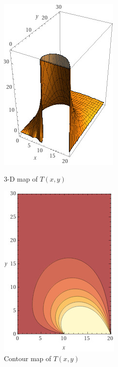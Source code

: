 \documentclass{article}
\numberwithin{equation}{section}
\begin{document}
\begin{figure}[!htb]
   \begin{minipage}{0.48\textwidth}
     \centering
     \includegraphics[width=.7\linewidth]{plot2.1.jpg}
     \caption{3-D map of $T(x,y)$}\label{Fig: 2.1}
   \end{minipage}\hfill
   \begin{minipage}{0.48\textwidth}
     \centering
     \includegraphics[width=.7\linewidth]{plot2.2.jpg}
     \caption{Contour map of $T(x,y)$}\label{Fig: 2.2}
   \end{minipage}
\end{figure}
\end{document}
